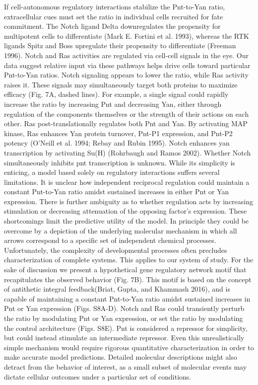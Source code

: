 If cell-autonomous regulatory interactions stabilize the Pnt-to-Yan ratio, extracellular cues must set the ratio in individual cells recruited for fate commitment. The Notch ligand Delta downregulates the propensity for multipotent cells to differentiate (Mark E. Fortini et al. 1993), whereas the RTK ligands Spitz and Boss upregulate their propensity to differentiate (Freeman 1996). Notch and Ras activities are regulated via cell-cell signals in the eye. Our data suggest relative input via these pathways helps drive cells toward particular Pnt-to-Yan ratios. Notch signaling appears to lower the ratio, while Ras activity raises it. These signals may simultaneously target both proteins to maximize efficacy (Fig. 7A, dashed lines). For example, a single signal could rapidly increase the ratio by increasing Pnt and decreasing Yan, either through regulation of the components themselves or the strength of their actions on each other. Ras post-translationally regulates both Pnt and Yan. By activating MAP kinase, Ras enhances Yan protein turnover, Pnt-P1 expression, and Pnt-P2 potency (O’Neill et al. 1994; Rebay and Rubin 1995). Notch enhances yan transcription by activating Su(H) (Rohrbaugh and Ramos 2002). Whether Notch simultaneously inhibits pnt transcription is unknown.
While its simplicity is enticing, a model based solely on regulatory interactions suffers several limitations. It is unclear how independent reciprocal regulation could maintain a constant Pnt-to-Yan ratio amidst sustained increases in either Pnt or Yan expression. There is further ambiguity as to whether regulation acts by increasing stimulation or decreasing attenuation of the opposing factor’s expression. These shortcomings limit the predictive utility of the model. In principle they could be overcome by a depiction of the underlying molecular mechanism in which all arrows correspond to a specific set of independent chemical processes. Unfortunately, the complexity of developmental processes often precludes characterization of complete systems. This applies to our system of study. For the sake of discussion we present a hypothetical gene regulatory network motif that recapitulates the observed behavior (Fig. 7B). This motif is based on the concept of antithetic integral feedback(Briat, Gupta, and Khammash 2016), and is capable of maintaining a constant Pnt-to-Yan ratio amidst sustained increases in Pnt or Yan expression (Figs. S8A-D). Notch and Ras could transiently perturb the ratio by modulating Pnt or Yan expression, or set the ratio by modulating the control architecture (Figs. S8E). Pnt is considered a repressor for simplicity, but could instead stimulate an intermediate repressor. Even this unrealistically simple mechanism would require rigorous quantitative characterization in order to make accurate model predictions. Detailed molecular descriptions might also detract from the behavior of interest, as a small subset of molecular events may dictate cellular outcomes under a particular set of conditions. 
